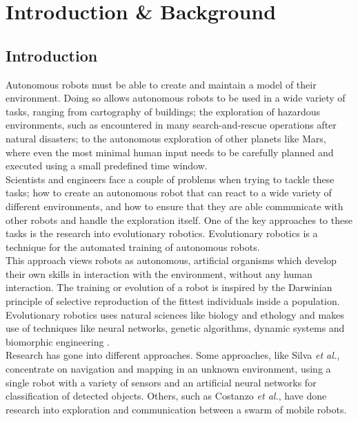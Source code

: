 \chapter{Introduction \& Background}

\section{Introduction}
Autonomous robots must be able to create and maintain a model of their environment. Doing so allows autonomous robots to be used in a wide variety of tasks, ranging from cartography of buildings; the exploration of hazardous environments, such as encountered in many search-and-rescue operations after natural disasters; to the autonomous exploration of other planets like Mars, where even the most minimal human input needs to be carefully planned and executed using a small predefined time window. \\

Scientists and engineers face a couple of problems when trying to tackle these tasks; how to create an autonomous robot that can react to a wide variety of different environments, and how to ensure that they are able  communicate with other robots and handle the exploration itself.
One of the key approaches to these tasks is the research into evolutionary robotics. 
Evolutionary robotics is a technique for the automated training of autonomous robots. \\

This approach views robots as autonomous, artificial organisms which develop their own skills in interaction with the environment, without any human interaction.
The training or evolution of a robot is inspired by the Darwinian principle of selective reproduction of the fittest individuals inside a population. Evolutionary robotics uses natural sciences like biology and ethology and makes use of techniques like neural networks, genetic algorithms, dynamic systems and biomorphic engineering \cite{nolfi2000evolutionary}.\\

Research has gone into different approaches. Some approaches, like Silva \textit{et al.}\cite{Silva2008}, concentrate on navigation and mapping in an unknown environment, using a single robot with a variety of sensors and an  artificial neural networks for classification of detected objects. Others, such as Costanzo \textit{et al.}\cite{Costanzo20121047}, have done research into exploration and communication between a swarm of mobile robots.\\

